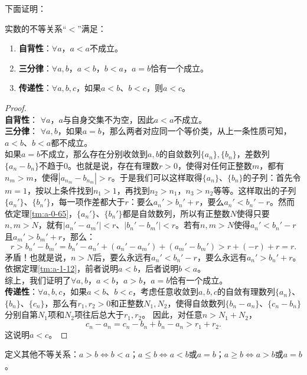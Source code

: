 \documentclass[12pt,UTF8]{ctexbook}
\begin{document}
\begin{appendix}
下面证明：
\begin{tm}\label{tm:a-1-15}
    实数的不等关系“$<$”满足：
    \begin{enumerate}
        \item \textbf{自背性}：$\forall a$，$a < a$不成立。
        \item \textbf{三分律}：$\forall a, b$，$a < b$，$b < a$，$a = b$恰有一个成立。
        \item \textbf{传递性}：$\forall a, b, c$，如果$a < b$、$b < c$，则$a < c$。
    \end{enumerate}
\end{tm}
\begin{proof}
    \mbox{} \\
    \textbf{自背性}： $\forall a$，$a$与自身交集不为空，因此$a<a$不成立。\\
    \textbf{三分律}： $\forall a, b$，如果$a = b$，那么两者对应同一个等价类，从上一条性质可知，$a<b$、$b<a$都不成立。\\
    如果$a = b$不成立，那么存在分别收敛到$a,b$的自敛数列$\{a_n\}, \{b_n\}$，差数列$\{a_n - b_n\}$不趋于$0$。也就是说，存在有理数$r>0$，使得对任何正整数$m$，都有$n_m>m$，使得$|a_{n_m} - b_{n_m}| > r$。于是我们可以这样取得$\{a_n\}$、$\{b_n\}$的子列：首先令$m=1$，按以上条件找到$n_1>1$，再找到$n_2>n_1$，$n_3>n_2$等等。这样取出的子列$\{a_n'\}$、$\{b_n'\}$，每一项作差都大于$r$：要么$a_{n}' > b_{n}' + r$，要么$a_{n}' < b_{n}' - r$。然而依定理\ref{tm:a-0-65}，$\{a_n'\}$、$\{b_n'\}$都是自敛数列，所以有正整数$N$使得只要$n,m>N$，就有$|a_n' - a_m'| < r$、$|b_n' - b_m'| < r$。若有$n,m>N$使得$a_{n}' < b_{n}' - r$且$a_{m}' > b_{m}' + r$，那么：
    $$ r > b_{n}' - b_m' = b_{n}' - a_{n}' + (a_{n}' - a_m') + (a_m' - b_m') > r + (-r) + r = r.$$
    矛盾！也就是说，$n>N$后，要么永远有$a_{n}' < b_{n}' - r$，要么永远有$a_{n}' > b_{n}' + r$。依据定理\ref{tm:a-1-12}，前者说明$a<b$，后者说明$b<a$。\\
    综上，我们证明了$\forall a, b$，$a < b$，$a > b$，$a = b$恰有一个成立。\\
    \textbf{传递性}：$\forall a, b, c$，如果$a < b$、$b < c$，考虑任意收敛到$a,b,c$的自敛有理数列$\{a_n\}$、$\{b_n\}$、$\{c_n\}$，那么有$r_1, r_2>0$和正整数$N_1, N_2$，使得自敛数列$\{b_n - a_n\}$、$\{c_n - b_n\}$分别自第$N_1$项和$N_2$项往后总大于$r_1, r_2$。
    因此，对任意$n>N_1 + N_2$，
    $$ c_n - a_n = c_n - b_n + b_n - a_n > r_1 + r_2.$$
    这说明$a<c$。
\end{proof}

定义其他不等关系：$a>b \Leftrightarrow b<a$；$a\leqslant b \Leftrightarrow a < b$或$a = b$；$a\geqslant b \Leftrightarrow a > b$或$a = b$。


\end{appendix}
\end{document}
